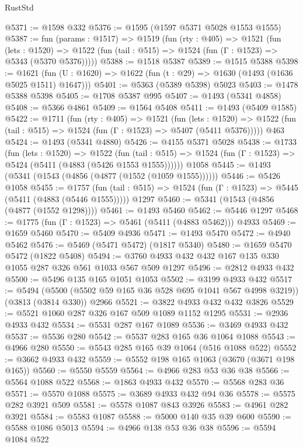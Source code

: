 \begin{lexlean}{RustStd}
\begin{coremodule}
@5371 := @1598 @332
@5376 := @1595 (@1597 @5371 @5028 @1553 @1555)
@5387 := fun (params : @1517) =>
  @1519
    (fun (rty : @405) =>
    @1521
      (fun (lets : @1520) =>
      @1522 (fun (tail : @515) => @1524 (fun (Γ : @1523) => @5343 (@5370 @5376)))))
@5388 := @1518 @5387
@5389 := @1515 @5388
@5398 := @1621 (fun (U : @1620) => @1622 (fun (t : @29) => @1630 (@1493 (@1636 @5025 @1511) @1647)))
@5401 := @5363 (@5389 @5398) @5023
@5403 := @1478 @5388 @5398
@5405 := @1708 @5387 @995
@5407 := @1493 (@5341 @4858)
@5408 := @5366 @4861
@5409 := @1564 @5408
@5411 := @1493 (@5409 @1585)
@5422 := @1711
    (fun (rty : @405) =>
    @1521
      (fun (lets : @1520) =>
      @1522 (fun (tail : @515) => @1524 (fun (Γ : @1523) => @5407 (@5411 @5376)))))
    @463
@5424 := @1493 (@5341 @4880)
@5426 := @4155 @5371 @5028
@5438 := @1733
    (fun (lets : @1520) =>
    @1522
      (fun (tail : @515) => @1524 (fun (Γ : @1523) => @5424 (@5411 (@4883 (@5426 @1553 @1555))))))
    @1058
@5445 := @1493 (@5341 (@1543 (@4856 (@4877 (@1552 (@1059 @1555))))))
@5446 := @5426 @1058
@5455 := @1757
    (fun (tail : @515) => @1524 (fun (Γ : @1523) => @5445 (@5411 (@4883 (@5446 @1555)))))
    @1297
@5460 := @5341 (@1543 (@4856 (@4877 (@1552 @1298))))
@5461 := @1493 @5460
@5462 := @5446 @1297
@5468 := @1775 (fun (Γ : @1523) => @5461 (@5411 (@4883 @5462))) @4933
@5469 := @1659 @5460
@5470 := @5409 @4936
@5471 := @1493 @5470
@5472 := @4940 @5462
@5476 := @5469 (@5471 @5472) (@1817 @5340)
@5480 := @1659 @5470 @5472 (@1822 @5408)
@5494 := @3760 @4933 @432 @432 @167 @135 @330 @1055 @287 @326 @561 @1033 @567 @509 @1297
@5496 := @2812 @4933 @432
@5500 := @5496 @135 @165 @1051 @1053
@5502 := @3199 @4933 @432
@5517 := @5494
    (@5500 (@5502 @59 @165 @36 @528 @695 @1041 @567 @4998 @3219))
    (@3813 (@3814 @330))
    @2966
@5521 := @3822 @4933 @432 @432 @3826
@5529 := @5521 @1060 @287 @326 @167 @509 @1089 @1152 @1295
@5531 := @2936 @4933 @432
@5534 := @5531 @287 @167 @1089
@5536 := @3469 @4933 @432
@5537 := @5536 @280
@5542 := @5537 @283 @165 @36 @1064 @1088
@5543 := @4966 @280
@5550 := @5543 @285 @165 @39 @1064 (@516 @1088 @522)
@5552 := @3662 @4933 @432
@5559 := @5552 @198 @165 @1063 (@3670 (@3671 @198 @165))
@5560 := @5550 @5559
@5564 := @4966 @283 @53 @36 @38
@5566 := @5564 @1088 @522
@5568 := @1863 @4933 @432
@5570 := @5568 @283 @36
@5571 := @5570 @1088
@5575 := @3689 @4933 @432 @94 @36
@5578 := @5575 @282 @3921 @509
@5581 := @5578 @1087 @843 @3926
@5583 := @4961 @282 @3921
@5584 := @5583 @1087
@5588 := @5000 @140 @35 @39 @600
@5590 := @5588 @1086 @5013
@5594 := @4966 @138 @53 @36 @38
@5596 := @5594 @1084 @522

\end{coremodule}
\end{lexlean}
